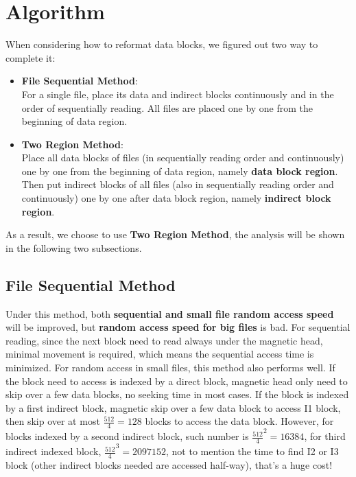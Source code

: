 \documentclass{article}
\begin{document}
	\section{Algorithm}
	When considering how to reformat data blocks, we figured out two way to complete it:
	\begin{itemize}
		\item \textbf{File Sequential Method}:\\
		For a single file, place its data and indirect blocks continuously and in the order of sequentially reading. All files are placed one by one from the beginning of data region.
		\item \textbf{Two Region Method}:\\
		Place all data blocks of files (in sequentially reading order and continuously) one by one from the beginning of data region, namely \textbf{data block region}. Then put indirect blocks of all files (also in sequentially reading order and continuously) one by one after data block region, namely \textbf{indirect block region}.
	\end{itemize}
	As a result, we choose to use \textbf{Two Region Method}, the analysis will be shown in the following two subsections.
	
	\subsection{File Sequential Method}
	Under this method, both \textbf{sequential and small file random access speed} will be improved, but \textbf{random access speed for big files} is bad. For sequential reading, since the next block need to read always under the magnetic head, minimal movement is required, which means the sequential access time is minimized. For random access in small files, this method also performs well. If the block need to access is indexed by a direct block, magnetic head only need to skip over a few data blocks, no seeking time in most cases. If the block is indexed by a first indirect block, magnetic skip over a few data block to access I1 block, then skip over at most $\frac{512}{4}=128$ blocks to access the data block. However, for blocks indexed by a second indirect block, such number is ${\frac{512}{4}}^2=16384$, for third indirect indexed block, ${\frac{512}{4}}^3=2097152$, not to mention the time to find I2 or I3 block (other indirect blocks needed are accessed half-way), that's a huge cost!
	
\end{document}
